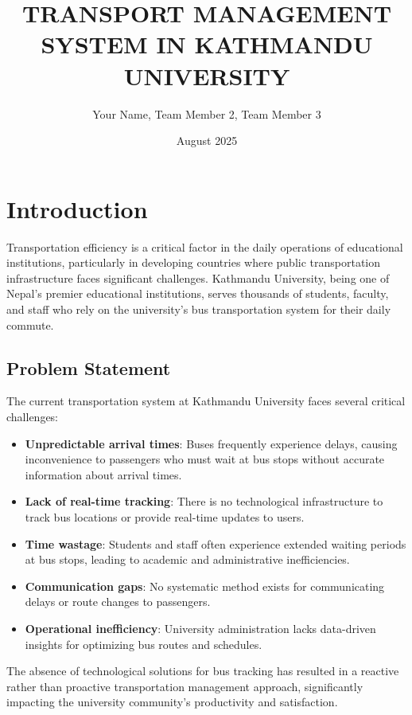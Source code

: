 \documentclass[12pt,a4paper]{article}
\title{\textbf{TRANSPORT MANAGEMENT SYSTEM IN KATHMANDU UNIVERSITY}}
\author{Your Name, Team Member 2, Team Member 3}
\date{August 2025}
\begin{document}
\maketitle

\section{Introduction}

Transportation efficiency is a critical factor in the daily operations of educational institutions, particularly in developing countries where public transportation infrastructure faces significant challenges. Kathmandu University, being one of Nepal's premier educational institutions, serves thousands of students, faculty, and staff who rely on the university's bus transportation system for their daily commute.

\subsection{Problem Statement}

The current transportation system at Kathmandu University faces several critical challenges:

\begin{itemize}
    \item \textbf{Unpredictable arrival times}: Buses frequently experience delays, causing inconvenience to passengers who must wait at bus stops without accurate information about arrival times.
    \item \textbf{Lack of real-time tracking}: There is no technological infrastructure to track bus locations or provide real-time updates to users.
    \item \textbf{Time wastage}: Students and staff often experience extended waiting periods at bus stops, leading to academic and administrative inefficiencies.
    \item \textbf{Communication gaps}: No systematic method exists for communicating delays or route changes to passengers.
    \item \textbf{Operational inefficiency}: University administration lacks data-driven insights for optimizing bus routes and schedules.
\end{itemize}

The absence of technological solutions for bus tracking has resulted in a reactive rather than proactive transportation management approach, significantly impacting the university community's productivity and satisfaction.
\end{document}
